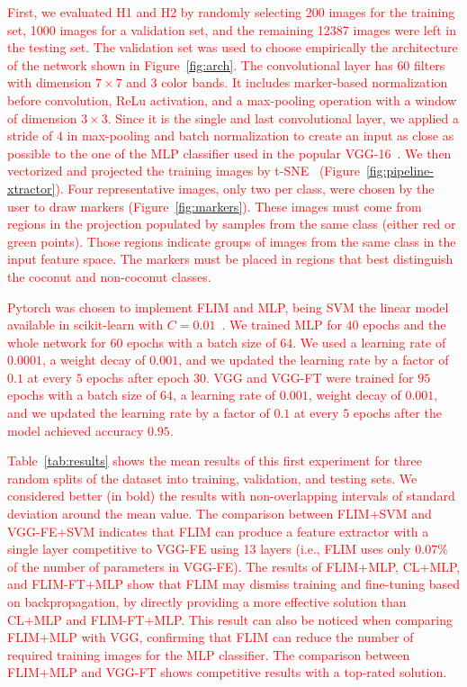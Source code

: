 \documentclass[journal, twoside]{IEEEtran}
\begin{document}
\textcolor{red}{First, we evaluated H1 and H2 by randomly selecting 200 images for the training set, 1000 images for a validation set, and the remaining 12387 images were left in the testing set. The validation set was used to choose empirically the architecture of the network shown in Figure~\ref{fig:arch}. The convolutional layer has $60$ filters with dimension $7 \times 7$ and 3 color \textcolor{red}{bands}. It includes marker-based normalization before convolution, ReLu activation, and a max-pooling operation with a window of dimension $3 \times 3$. Since it is the single and last convolutional layer, we applied a stride of $4$ in max-pooling and batch normalization to create an input as close as possible to the one of the \textcolor{red}{MLP} classifier used in the popular VGG-16~\cite{simonyan2014very}. We then vectorized and projected the training images by t-SNE~\cite{maaten2008visualizing} (Figure~\ref{fig:pipeline-xtractor}). Four representative images, only two per class, were chosen by the user to draw markers (Figure~\ref{fig:markers}). These images must come from regions in the projection populated by samples from the same class (either red or green points). Those regions indicate groups of images from the same class in the input feature space. The markers must be placed in regions that best distinguish the coconut and non-coconut classes.}

\textcolor{red}{Pytorch was chosen to implement FLIM and MLP, being SVM the linear model available in scikit-learn with $C=0.01$~\cite{fan2008liblinear, scikit-learn}. We trained MLP for $40$ epochs and the whole network for $60$ epochs with a batch size of $64$. We used a learning rate of $0.0001$, a weight decay of $0.001$, and we updated the learning rate by a factor of $0.1$ at every $5$ epochs after epoch 30. VGG and VGG-FT were trained for $95$ epochs with a batch size of $64$, a learning rate of $0.001$, weight decay of $0.001$, and we updated the learning rate by a factor of $0.1$ at every $5$ epochs after the model achieved accuracy $0.95$.}

\textcolor{red}{
Table~\ref{tab:results} shows the mean results of this first experiment for three random splits of the dataset into training, validation, and testing sets. We considered better (in bold) the results with non-overlapping intervals of standard deviation around the mean value. The comparison between FLIM+SVM and VGG-FE+SVM indicates that FLIM can produce a feature extractor with a single layer competitive to VGG-FE using 13 layers (i.e., FLIM uses only $0.07\%$ of the number of parameters in VGG-FE). The results of FLIM+MLP, CL+MLP, and FLIM-FT+MLP show that FLIM may dismiss training and fine-tuning based on backpropagation, by directly providing a more effective solution than CL+MLP and FLIM-FT+MLP. This result can also be noticed when comparing  FLIM+MLP with VGG, confirming that FLIM can reduce the number of required training images for the MLP classifier. The comparison between FLIM+MLP and VGG-FT shows competitive results with a top-rated solution.}
\end{document}
